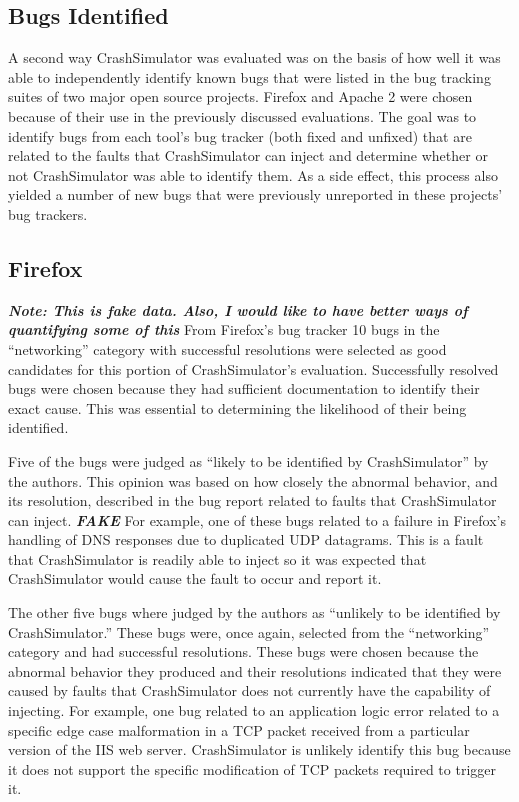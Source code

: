     \subsection{Bugs Identified}

        A second way CrashSimulator was evaluated was on the basis of how well it was able to independently identify
        known bugs that were listed in the bug tracking suites of two major open source projects. Firefox and Apache 2
        were chosen because of their use in the previously discussed evaluations. The goal was to identify bugs from
        each tool's bug tracker (both fixed and unfixed) that are related to the faults that CrashSimulator can inject
        and determine whether or not CrashSimulator was able to identify them. As a side effect, this process also
        yielded a number of new bugs that were previously unreported in these projects' bug trackers.

        \subsection{Firefox}

            \textbf{\emph{Note: This is fake data. Also, I would like to have better ways of quantifying some of this}}
            From Firefox's bug tracker 10 bugs in the ``networking'' category with successful resolutions were selected
            as good candidates for this portion of CrashSimulator's evaluation. Successfully resolved bugs were chosen
            because they had sufficient documentation to identify their exact cause. This was essential to determining
            the likelihood of their being identified.

            Five of the bugs were judged as ``likely to be identified by CrashSimulator'' by the authors. This opinion
            was based on how closely the abnormal behavior, and its resolution, described in the bug report related to
            faults that CrashSimulator can inject. \textbf{\emph{FAKE}} For example, one of these bugs related to a
            failure in Firefox's handling of DNS responses due to duplicated UDP datagrams. This is a fault that
            CrashSimulator is readily able to inject so it was expected that CrashSimulator would cause the fault to
            occur and report it.

            The other five bugs where judged by the authors as ``unlikely to be identified by CrashSimulator.'' These
            bugs were, once again, selected from the ``networking'' category and had successful resolutions. These bugs
            were chosen because the abnormal behavior they produced and their resolutions indicated that they were
            caused by faults that CrashSimulator does not currently have the capability of injecting. For example, one
            bug related to an application logic error related to a specific edge case malformation in a TCP packet
            received from a particular version of the IIS web server. CrashSimulator is unlikely identify this bug
            because it does not support the specific modification of TCP packets required to trigger it.

